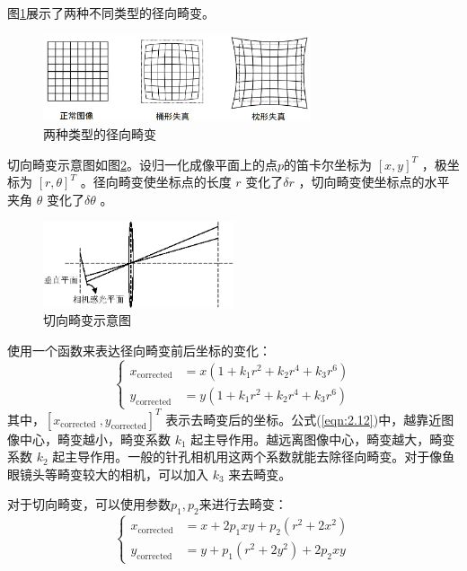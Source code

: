 图\ref{fig2_2}展示了两种不同类型的径向畸变。
\begin{figure}[h]\setlength{\belowcaptionskip}{-12pt}
	\centering
	\includegraphics[width=0.7\textwidth]{figures/chapter2/fig2_2}
	\caption{两种类型的径向畸变}\label{fig2_2}
\end{figure}

切向畸变示意图如图\ref{fig2_3}。设归一化成像平面上的点$p $的笛卡尔坐标为 $[x, y]^{T} $ ，极坐标为 $[r, \theta]^{T} $ 。径向畸变使坐标点的长度 $r $ 变化了$\delta r $  ，切向畸变使坐标点的水平夹角 $\theta$ 变化了$\delta \theta $  。
\begin{figure}[h]\setlength{\belowcaptionskip}{-12pt}
	\centering
	\includegraphics[width=0.5\textwidth]{figures/chapter2/fig2_3}
	\caption{切向畸变示意图}\label{fig2_3}
\end{figure}

使用一个函数来表达径向畸变前后坐标的变化：
\begin{equation}
\label{eqn:2.12}
\left\{\begin{aligned} x_{\text {corrected}} &=x\left(1+k_{1} r^{2}+k_{2} r^{4}+k_{3} r^{6}\right) \\ y_{\text {corrected}} &=y\left(1+k_{1} r^{2}+k_{2} r^{4}+k_{3} r^{6}\right) \end{aligned}\right.
\end{equation}
其中，$\left[x_{\text {corrected }}, y_{\text {corrected}}\right]^{T} $ 表示去畸变后的坐标。公式(\ref{eqn:2.12})中，越靠近图像中心，畸变越小，畸变系数 $k_1$  起主导作用。越远离图像中心，畸变越大，畸变系数 $k_2$ 起主导作用。一般的针孔相机用这两个系数就能去除径向畸变。对于像鱼眼镜头等畸变较大的相机，可以加入 $k_3$  来去畸变。

对于切向畸变，可以使用参数$p_1,p_2$来进行去畸变：
\begin{equation}
\label{eqn:2.13}
\left\{
\begin{aligned} 
x_{\text {corrected}} &=x+2 p_{1} x y+p_{2}\left(r^{2}+2 x^{2}\right) \\ 
y_{\text {corrected}} &=y+p_{1}\left(r^{2}+2 y^{2}\right)+2 p_{2} x y 
\end{aligned}
\right.
\end{equation}

